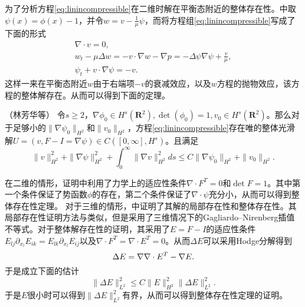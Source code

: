 为了分析方程\eqref{eq:linincompressible}在二维时解在平衡态附近的整体存在性。\cite{lin2005hydrodynamics}中取$\psi(x) = \phi(x)-1$，并令$w=v-\frac{1}{\mu}\psi$，而将方程组\eqref{eq:linincompressible}写成了下面的形式
\begin{eqnarray*}
	\nabla \cdot v =0 , \\
	w_t - \mu \Delta w = - v \cdot \nabla w - \nabla p = - \Delta \psi \nabla \psi + \frac{v}{\mu}, \\
	\psi_t + v \cdot \nabla \psi = -v.
\end{eqnarray*}
这样一来在平衡态附近$w$由于右端项$-v$的衰减效应，以及$w$方程的抛物效应，该方程的整体解存在。从而可以得到下面的定理。
\begin{theorem}（林芳华等\cite{lin2005hydrodynamics}）
	令$s \ge 2$，$\nabla \phi_0 \in H^s(\mathbf{R}^2),\det(\phi_0) = 1, v_0 \in H^s(\mathbf{R}^2)$。那么对于足够小的$\|\nabla \psi_0\|_{H^2}$和$\|v_0\|_{H^2}$，方程\eqref{eq:linincompressible}存在唯的整体光滑解$U=(v,F-I=\nabla \psi) \in C([0,\infty],H^s)$。且满足
	\begin{equation*}
		\|v\|_{H^2}^2 +\|\nabla \psi\|_{H^2}^2 + \int_0^\infty \|\nabla v\|_{H^2}
^2ds \le C \|\nabla \psi_0\|_{H^2} + \|v_0\|_{H^2}.
	\end{equation*}
	\end{theorem}
	在二维的情形，证明中利用了力学上的适应性条件$\nabla \cdot F^T = 0$和$\det F =1$。其中第一个条件保证了势函数$\phi$的存在，第二个条件保证了$\nabla \cdot \psi$充分小，从而可以得到整体存在性定理。
对于三维的情形，\cite{lei2008global}中证明了其解的局部存在性和整体存在性。其局部存在性证明方法与\cite{lin2005hydrodynamics}类似，但是采用了三维情况下的Gagliardo–Nirenberg插值不等式。对于整体解存在性的证明，其采用了$E=F-I$的适应性条件$E_{lj}\partial_{x_l} E_{ik}=E_{lk}\partial_{x_l} E_{ij}$以及$\nabla \cdot F^T=\nabla \cdot E^T=0$。从而$\Delta E$可以采用Hodge分解得到
\begin{equation*}
	\Delta E = \nabla \nabla \cdot E^T -  \nabla \time \nabla E.
\end{equation*}
于是成立下面的估计
\begin{equation*}
	\|\Delta E\|^2_{L^2} \le C \|E\|_{H^2}^2 \|\Delta E\|_{L^2}^2.
\end{equation*}
于是$E$很小时可以得到$\|\Delta E\|^2_{L^2}$有界，从而可以得到整体存在性定理的证明\cite{lin2005hydrodynamics}。

